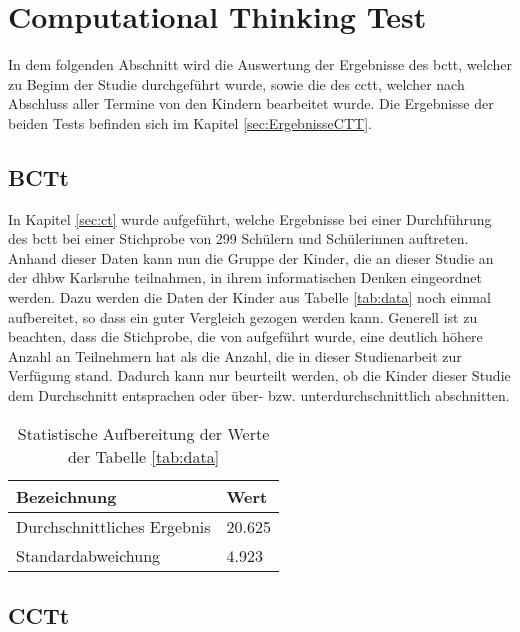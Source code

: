 \section{Computational Thinking Test}
	In dem folgenden Abschnitt wird die Auswertung der Ergebnisse des \acrshort{bctt}, welcher zu Beginn der Studie durchgeführt wurde, sowie die des \acrshort{cctt}, welcher nach Abschluss aller Termine von den Kindern bearbeitet wurde. Die Ergebnisse der beiden Tests befinden sich im Kapitel \ref{sec:ErgebnisseCTT}.
	\subsection{BCTt}
	In Kapitel \ref{sec:ct} wurde aufgeführt, welche Ergebnisse bei einer Durchführung des \acrshort{bctt} bei einer Stichprobe von 299 Schülern und Schülerinnen auftreten. Anhand dieser Daten kann nun die Gruppe der Kinder, die an dieser Studie an der \acrshort{dhbw} Karlsruhe teilnahmen, in ihrem informatischen Denken eingeordnet werden. Dazu werden die Daten der Kinder aus Tabelle \ref{tab:data} noch einmal aufbereitet, so dass ein guter Vergleich gezogen werden kann. Generell ist zu beachten, dass die Stichprobe, die von \citeauthor{bcct} aufgeführt wurde, eine deutlich höhere Anzahl an Teilnehmern hat als die Anzahl, die in dieser Studienarbeit zur Verfügung stand. Dadurch kann nur beurteilt werden, ob die Kinder dieser Studie dem Durchschnitt entsprachen oder über- bzw. unterdurchschnittlich abschnitten.
	\begin{table}[H]
		\centering
		\begin{tabular}{|l|l|}
			\hline
			\rowcolor[HTML]{C0C0C0} 
			Bezeichnung                 & Wert   \\ \hline
			Durchschnittliches Ergebnis & 20.625 \\ \hline
			Standardabweichung          & 4.923  \\ \hline
		\end{tabular}
	\caption{Statistische Aufbereitung der Werte der Tabelle \ref{tab:data}}
	\end{table}
	\subsection{CCTt}